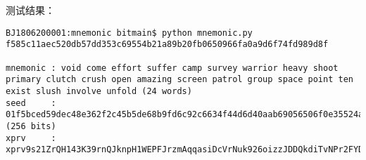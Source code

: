 测试结果：
\begin{lstlisting}
BJ1806200001:mnemonic bitmain$ python mnemonic.py f585c11aec520db57dd353c69554b21a89b20fb0650966fa0a9d6f74fd989d8f

mnemonic : void come effort suffer camp survey warrior heavy shoot primary clutch crush open amazing screen patrol group space point ten exist slush involve unfold (24 words)
seed     : 01f5bced59dec48e362f2c45b5de68b9fd6c92c6634f44d6d40aab69056506f0e35524a518034ddc1192e1dacd32c1ed3eaa3c3b131c88ed8e7e54c49a5d0998 (256 bits)
xprv     : xprv9s21ZrQH143K39rnQJknpH1WEPFJrzmAqqasiDcVrNuk926oizzJDDQkdiTvNPr2FYDYzWgiMiC63YmfPAa2oPyNB23r2g7d1yiK6WpqaQS
\end{lstlisting}

